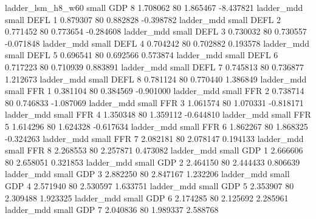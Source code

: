        ladder_lsm_h8_w60      small      GDP                 8 1.708062 80       1.865467          -8.437821
              ladder_mdd      small     DEFL                 1 0.879307 80       0.882828          -0.398782
              ladder_mdd      small     DEFL                 2 0.771452 80       0.773654          -0.284608
              ladder_mdd      small     DEFL                 3 0.730032 80       0.730557          -0.071848
              ladder_mdd      small     DEFL                 4 0.704242 80       0.702882           0.193578
              ladder_mdd      small     DEFL                 5 0.696541 80       0.692566           0.573874
              ladder_mdd      small     DEFL                 6 0.717223 80       0.710939           0.883891
              ladder_mdd      small     DEFL                 7 0.745813 80       0.736877           1.212673
              ladder_mdd      small     DEFL                 8 0.781124 80       0.770440           1.386849
              ladder_mdd      small      FFR                 1 0.381104 80       0.384569          -0.901000
              ladder_mdd      small      FFR                 2 0.738714 80       0.746833          -1.087069
              ladder_mdd      small      FFR                 3 1.061574 80       1.070331          -0.818171
              ladder_mdd      small      FFR                 4 1.350348 80       1.359112          -0.644810
              ladder_mdd      small      FFR                 5 1.614296 80       1.624328          -0.617634
              ladder_mdd      small      FFR                 6 1.862267 80       1.868325          -0.324263
              ladder_mdd      small      FFR                 7 2.082181 80       2.078147           0.194133
              ladder_mdd      small      FFR                 8 2.268553 80       2.257871           0.473082
              ladder_mdd      small      GDP                 1 2.666606 80       2.658051           0.321853
              ladder_mdd      small      GDP                 2 2.464150 80       2.444433           0.806639
              ladder_mdd      small      GDP                 3 2.882250 80       2.847167           1.232206
              ladder_mdd      small      GDP                 4 2.571940 80       2.530597           1.633751
              ladder_mdd      small      GDP                 5 2.353907 80       2.309488           1.923325
              ladder_mdd      small      GDP                 6 2.174285 80       2.125692           2.285961
              ladder_mdd      small      GDP                 7 2.040836 80       1.989337           2.588768
